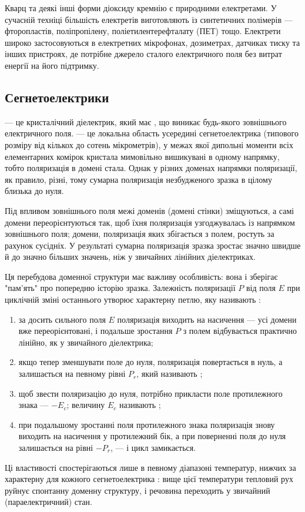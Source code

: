 Кварц та деякі інші форми діоксиду кремнію є природними електретами. У сучасній техніці більшість електретів виготовляють із синтетичних полімерів
--- фторопластів, поліпропілену, поліетилентерефталату (ПЕТ) тощо. Електрети широко застосовуються в електретних мікрофонах, дозиметрах, датчиках
тиску та інших пристроях, де потрібне джерело сталого електричного поля без витрат енергії на його підтримку.

\subsection*{Сегнетоелектрики}\label{sec:FE}

 --- це кристалічний діелектрик, який має , що виникає 
будь-якого зовнішнього електричного поля.  --- це локальна область усередині сегнетоелектрика (типового розміру від кількох до сотень
мікрометрів), у межах якої дипольні моменти всіх елементарних комірок кристала мимовільно вишикувані в одному напрямку, тобто поляризація в домені
стала. Однак у різних доменах напрямки поляризації, як правило, різні, тому сумарна поляризація незбудженого зразка в цілому близька до нуля.

Під впливом зовнішнього поля межі доменів (домені стінки) зміщуються, а самі домени переорієнтуються так, щоб їхня поляризація узгоджувалась із
напрямком зовнішнього поля; домени, поляризація яких збігається з полем, ростуть за рахунок сусідніх. У результаті сумарна поляризація зразка
зростає значно швидше й до значно більших значень, ніж у звичайних лінійних діелектриках.

Ця перебудова доменної структури має важливу особливість: вона  і зберігає "пам'ять" про попередню історію зразка. Залежність
поляризації $P$ від поля $E$ при циклічній зміні останнього утворює характерну петлю, яку називають :
\begin{enumerate}
	\item за досить сильного поля $E$ поляризація виходить на насичення --- усі домени вже переорієнтовані, і подальше зростання $P$ з полем
	      відбувається практично лінійно, як у звичайного діелектрика;
	\item якщо тепер зменшувати поле до нуля, поляризація  повертається в нуль, а залишається на певному рівні $P_r$, який називають
	      ;
	\item щоб звести поляризацію до нуля, потрібно прикласти поле протилежного знака --- $-E_c$; величину $E_c$ називають ;
	\item при подальшому зростанні поля протилежного знака поляризація знову виходить на насичення у протилежний бік, а при поверненні поля до нуля
	      залишається на рівні $-P_r$, --- і цикл замикається.
\end{enumerate}
Ці властивості спостерігаються лише в певному діапазоні температур, нижчих за характерну для кожного сегнетоелектрика : вище
цієї температури тепловий рух руйнує спонтанну доменну структуру, і речовина переходить у звичайний (параелектричний) стан.

